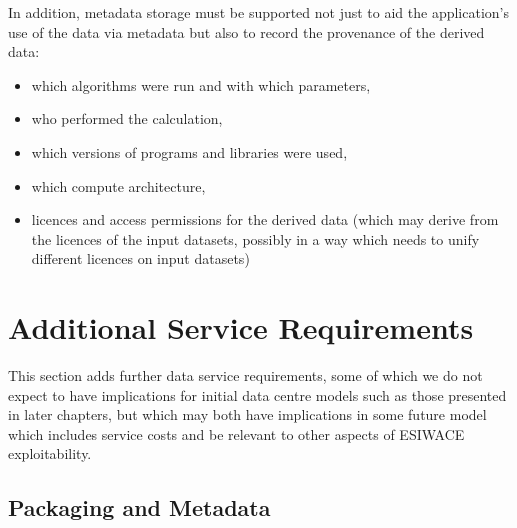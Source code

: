 In addition, metadata storage must be supported not just to aid the application's
use of the data via metadata but also to record the provenance of the derived
data:
\begin{itemize}
\item which algorithms were run and with which parameters,
\item who performed the calculation,
\item which versions of programs and libraries were used,
\item which compute architecture,
\item licences and access permissions for the derived data (which may derive from the licences of the input datasets, possibly in a way which needs to unify different licences on input datasets)
\end{itemize}

\section{Additional Service Requirements}

This section adds further data service requirements, some of which we do not
expect to have implications for initial data centre models such as those
presented in later chapters, but which may both have implications in some future
model which includes service costs and be relevant to other aspects of ESIWACE
exploitability.

\subsection{Packaging and Metadata}
\label{sec:packaging_and_metadata}

